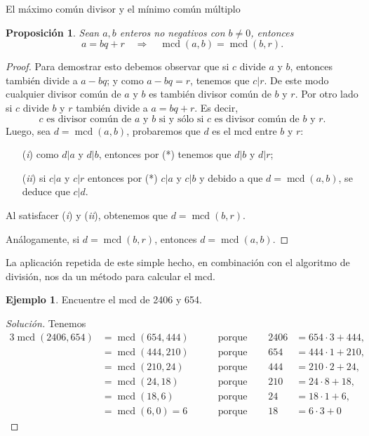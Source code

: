 \documentclass[11pt,spanish,makeidx]{amsbook}
\newtheorem{proposicion}[teorema]{Proposici\'on}
\theoremstyle{definition}
\newtheorem{ejemplo}{Ejemplo}[section]
\theoremstyle{remark}
\newcommand \mcd{\operatorname{mcd}}
\begin{document}
\begin{section}{El máximo común divisor y el mínimo común múltiplo}
\begin{proposicion}\label{prop-alg-eucl} Sean  $a,b$ enteros no negativos con $b \not=0$, entonces 
\begin{equation}\label{bec}
a=bq+r\quad \Rightarrow \quad\mcd(a,b)=\mcd(b,r).
\end{equation}
\end{proposicion}
\begin{proof}
Para demostrar esto debemos observar que si $c$ divide $a$ y $b$, entonces también divide a $a-bq$; y como $a-bq=r$, tenemos que $c|r$. De este modo cualquier divisor común de $a$ y $b$ es también divisor común de $b$ y $r$.  Por otro lado si $c$ divide $b$ y $r$ también divide a $a=bq+r$. Es decir, 
\begin{equation}\label{eqmcd1}
\text{$c$ es divisor común de $a$ y $b$ si y sólo si $c$ es divisor común de $b$ y $r$.} \tag{*}
\end{equation}
Luego, sea $d = \mcd(a,b)$, probaremos que $d$ es el mcd entre $b$ y $r$:
\begin{enumerate}
\item[({\em i})] como $d|a$ y $d|b$, entonces por (*) tenemos que $ d|b$ y $d|r$;
\item[({\em ii})] si $c|a $ y $c|r$ entonces por (*)  $c|a$ y $c|b$ y debido a que $d = \mcd(a,b)$, se deduce que $c|d$.
\end{enumerate}
Al satisfacer ({\em i}) y ({\em ii}), obtenemos que $d = \mcd(b,r)$.

Análogamente, si $d = \mcd(b,r)$, entonces  $d = \mcd(a,b)$.
\end{proof}

La aplicación repetida de este simple hecho, en combinación con el algoritmo de división, nos da un método para calcular el mcd.

\begin{ejemplo} Encuentre el mcd de 2406 y 654.
\end{ejemplo}
\begin{proof}[Solución] Tenemos
\begin{alignat*}3
\mcd(2406,654)&=\mcd(654,444)&\quad &\text{ porque }\quad& 2406&=654\cdot3+444,\\
               &=\mcd(444,210)& &\text{ porque }\quad& 654&=444\cdot1+210,\\
               &=\mcd(210,24)&& \text{ porque }\quad &444&=210\cdot2+24,\\
               &=\mcd(24,18) && \text{ porque }\quad &210&=24\cdot8+18,\\
               &=\mcd(18,6)  && \text{ porque }\quad &24 &=18\cdot1+6,\\
               & =\mcd(6,0) = 6           &&\text{ porque }\quad&18&=6\cdot3 + 0
\end{alignat*}


\end{proof}
\end{section}
\end{document}
